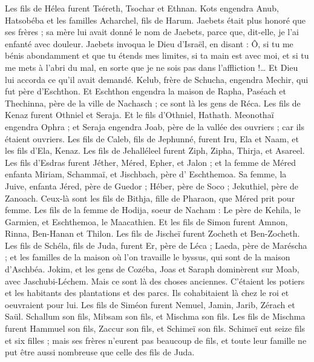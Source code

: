 \begin{multicols}{2}
Les fils de Hélea furent Tséreth, Tsochar et Ethnan.
Kots engendra Anub, Hatsobéba et les familles Acharchel, fils de Harum.
Jaebets était plus honoré que ses frères ; sa mère lui avait donné le nom de Jaebets, parce que, dit-elle, je l'ai enfanté avec douleur.
Jaebets invoqua le Dieu d'Israël, en disant : Ô, si tu me bénis abondamment et que tu étends mes limites, si ta main est avec moi, et si tu me mets à l'abri du mal, en sorte que je ne sois pas dans l'affliction !… Et Dieu lui accorda ce qu'il avait demandé.
Kelub, frère de Schucha, engendra Mechir, qui fut père d'Eschthon.
Et Eschthon engendra la maison de Rapha, Paséach et Thechinna, père de la ville de Nachasch ; ce sont là les gens de Réca.
Les fils de Kenaz furent Othniel et Seraja. Et le fils d'Othniel, Hathath.
Meonothaï engendra Ophra ; et Seraja engendra Joab, père de la vallée des ouvriers ; car ils étaient ouvriers.
Les fils de Caleb, fils de Jephunné, furent Iru, Ela et Naam, et les fils d'Ela, Kenaz.
Les fils de Jehalléleel furent Ziph, Zipha, Thirja, et Asareel.
Les fils d'Esdras furent Jéther, Méred, Epher, et Jalon ; et la femme de Méred enfanta Miriam, Schammaï, et Jischbach, père d' Eschthemoa.
Sa femme, la Juive, enfanta Jéred, père de Guedor ; Héber, père de Soco ; Jekuthiel, père de Zanoach. Ceux-là sont les fils de Bithja, fille de Pharaon, que Méred prit pour femme.
Les fils de la femme de Hodija, soeur de Nacham : Le père de Kehila, le Garmien, et Eschthemoa, le Maacathien.
Et les fils de Simon furent Amnon, Rinna, Ben-Hanan et Thilon. Les fils de Jischeï furent Zocheth et Ben-Zocheth.
Les fils de Schéla, fils de Juda, furent Er, père de Léca ; Laeda, père de Maréscha ; et les familles de la maison où l'on travaille le byssus, qui sont de la maison d'Aschbéa.
Jokim, et les gens de Cozéba, Joas et Saraph dominèrent sur Moab, avec Jaschubi-Léchem. Mais ce sont là des choses anciennes.
C'étaient les potiers et les habitants des plantations et des parcs. Ils cohabitaient là chez le roi et oeuvraient pour lui.
Les fils de Siméon furent Nemuel, Jamin, Jarib, Zérach et Saül.
Schallum son fils, Mibsam son fils, et Mischma son fils.
Les fils de Mischma furent Hammuel son fils, Zaccur son fils, et Schimeï son fils.
Schimeï eut seize fils et six filles ; mais ses frères n'eurent pas beaucoup de fils, et toute leur famille ne put être aussi nombreuse que celle des fils de Juda.

\end{multicols}
